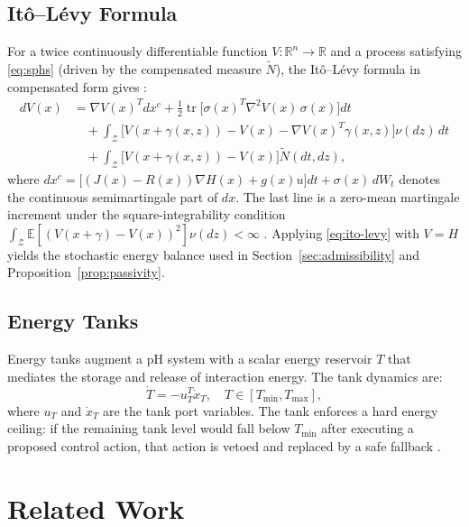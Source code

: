 \documentclass[11pt]{article}
\begin{document}
\subsection{It\^{o}--L\'{e}vy Formula}

For a twice continuously differentiable function $V:\mathbb{R}^n\to\mathbb{R}$ and a process
satisfying \eqref{eq:sphs} (driven by the compensated measure $\tilde{N}$), the It\^{o}--L\'{e}vy
formula in compensated form gives \cite{applebaum2009,cont2004}:
\begin{align}
dV(x) &= \nabla V(x)^T dx^c
         + \tfrac{1}{2}\operatorname{tr}\!\bigl[\sigma(x)^T\nabla^2 V(x)\,\sigma(x)\bigr]dt
\nonumber\\
&\quad + \int_{\mathcal{Z}}\bigl[V(x+\gamma(x,z))-V(x)-\nabla V(x)^T\gamma(x,z)\bigr]\nu(dz)\,dt
\nonumber\\
&\quad + \int_{\mathcal{Z}}\bigl[V(x+\gamma(x,z))-V(x)\bigr]\tilde{N}(dt,dz),
\label{eq:ito-levy}
\end{align}
where $dx^c=\bigl[(J(x)-R(x))\nabla H(x)+g(x)u\bigr]dt+\sigma(x)\,dW_t$ denotes the
continuous semimartingale part of $dx$. The last line is a zero-mean martingale increment
under the square-integrability condition
$\int_{\mathcal{Z}}\mathbb{E}[(V(x+\gamma)-V(x))^2]\nu(dz)<\infty$
\cite{applebaum2009}. Applying \eqref{eq:ito-levy} with $V=H$ yields the stochastic energy
balance used in Section~\ref{sec:admissibility} and Proposition~\ref{prop:passivity}.

\subsection{Energy Tanks}

Energy tanks \cite{ferraguti2013,ferraguti2015,secchi2007} augment a pH system with a scalar
energy reservoir $T$ that mediates the storage and release of interaction energy. The tank
dynamics are:
\begin{equation}
\dot{T} = -u_T^T \dot{x}_T, \quad T\in[T_{\min},T_{\max}],
\label{eq:tank}
\end{equation}
where $u_T$ and $\dot{x}_T$ are the tank port variables. The tank enforces a hard energy
ceiling: if the remaining tank level would fall below $T_{\min}$ after executing a proposed
control action, that action is vetoed and replaced by a safe fallback \cite{ferraguti2013}.

\section{Related Work}
\label{sec:related}
\end{document}

